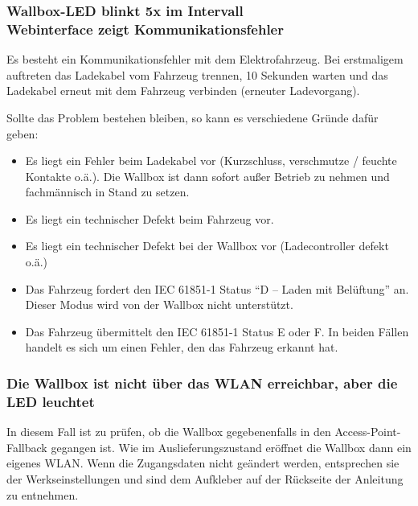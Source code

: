 \documentclass[a4paper,10pt]{article}
\begin{document}
\begin{multicols*}{2}
	\subsubsection*{Wallbox-LED blinkt 5x im Intervall \\ Webinterface zeigt Kommunikationsfehler}
	Es besteht ein Kommunikationsfehler mit dem Elektrofahrzeug. Bei erstmaligem
	auftreten das Ladekabel vom Fahrzeug trennen, 10 Sekunden warten und das
	Ladekabel erneut mit dem Fahrzeug verbinden (erneuter Ladevorgang).

	Sollte das Problem bestehen bleiben, so kann es verschiedene Gründe dafür
	geben:
	\begin{itemize}
		\item Es liegt ein Fehler beim Ladekabel vor (Kurzschluss, verschmutze / feuchte
		      Kontakte o.ä.). Die Wallbox ist dann sofort außer Betrieb zu nehmen und
		      fachmännisch in Stand zu setzen.
		\item Es liegt ein technischer Defekt beim Fahrzeug vor.
		\item Es liegt ein technischer Defekt bei der Wallbox vor (Ladecontroller defekt o.ä.)
		\item Das Fahrzeug fordert den IEC 61851-1 Status \enquote{D – Laden mit Belüftung}
		      an. Dieser Modus wird von der Wallbox nicht unterstützt.
		\item Das Fahrzeug übermittelt den IEC 61851-1 Status E oder F. In beiden Fällen
		      handelt es sich um einen Fehler, den das Fahrzeug erkannt hat.
	\end{itemize}

	\subsubsection*{Die Wallbox ist nicht über das WLAN erreichbar, aber die LED leuchtet}
	In diesem Fall ist zu prüfen, ob die Wallbox gegebenenfalls in den Access-Point-Fallback
	gegangen ist. Wie im Auslieferungszustand eröffnet die Wallbox dann ein eigenes
	WLAN. Wenn die Zugangsdaten nicht geändert werden, entsprechen sie der Werkseinstellungen und sind dem
	Aufkleber auf der Rückseite der Anleitung zu entnehmen.


\end{multicols*}
\end{document}
